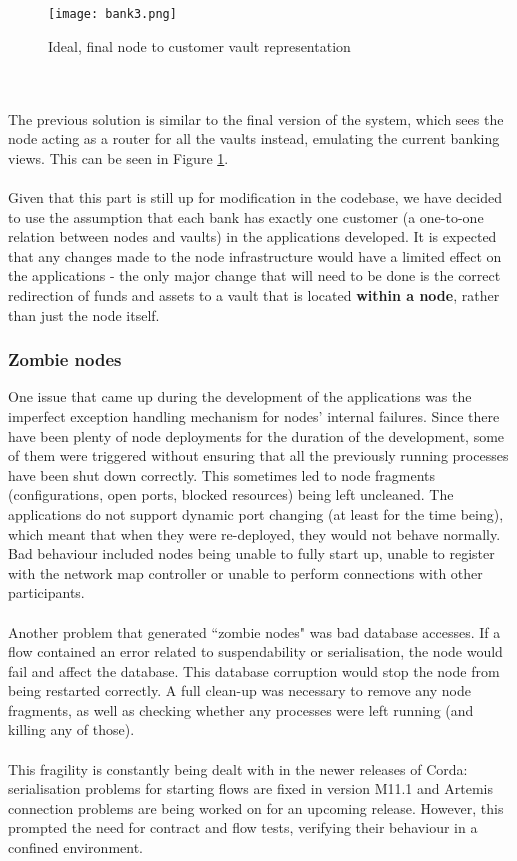 \documentclass[12pt,twoside]{article}
\begin{document}
\\ \\
\begin{figure}[!htb]
\centering
\texttt{[image: bank3.png]}
\caption{Ideal, final node to customer vault representation}
\centering
\label{fig:bank3}
\end{figure}
\\ \\
The previous solution is similar to the final version of the system, which sees the node acting as a router for all the vaults instead, emulating the current banking views. This can be seen in Figure \ref{fig:bank3}. 
\\ \\
Given that this part is still up for modification in the codebase, we have decided to use the assumption that each bank has exactly one customer (a one-to-one relation between nodes and vaults) in the applications developed. It is expected that any changes made to the node infrastructure would have a limited effect on the applications - the only major change that will need to be done is the correct redirection of funds and assets to a vault that is located \textbf{within a node}, rather than just the node itself.

\subsubsection{Zombie nodes}
\label{sub:zombies}
One issue that came up during the development of the applications was the imperfect exception handling mechanism for nodes' internal failures. Since there have been plenty of node deployments for the duration of the development, some of them were triggered without ensuring that all the previously running processes have been shut down correctly. This sometimes led to node fragments (configurations, open ports, blocked resources) being left uncleaned. The applications do not support dynamic port changing (at least for the time being), which meant that when they were re-deployed, they would not behave normally. Bad behaviour included nodes being unable to fully start up, unable to register with the network map controller or unable to perform connections with other participants.
\\ \\
Another problem that generated ``zombie nodes" was bad database accesses. If a flow contained an error related to suspendability or serialisation, the node would fail and affect the database. This database corruption would stop the node from being restarted correctly. A full clean-up was necessary to remove any node fragments, as well as checking whether any processes were left running (and killing any of those).
\\ \\
This fragility is constantly being dealt with in the newer releases of Corda: serialisation problems for starting flows are fixed in version M11.1 and Artemis connection problems are being worked on for an upcoming release. However, this prompted the need for contract and flow tests, verifying their behaviour in a confined environment. 
\end{document}
